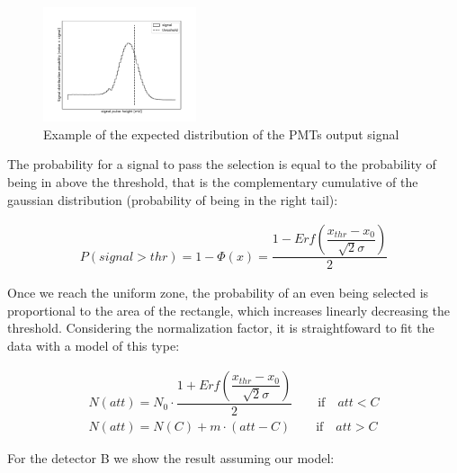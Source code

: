 {\begin{figure}[hbtp]
\centering
\includegraphics[width = 0.40\textwidth]{Analysis/distribution.pdf}
\caption{Example of the expected distribution of the PMTs output signal}
\label{fig:PDF}
\end{figure}

The probability for a signal to pass the selection is equal to the probability of being in above the threshold, that is the complementary cumulative of the gaussian distribution (probability of being in the right tail):

\begin{align*}
P(signal > thr) = 1 - \Phi(x) = \dfrac{1 - Erf(\dfrac{x_{thr} - x_{0}}{\sqrt{2} \sigma })}{2}
\end{align*}

Once we reach the uniform zone, the probability of an even being selected is proportional to the area of the rectangle, which increases linearly decreasing the threshold. Considering the normalization factor, it is straightfoward to fit the data with a model of this type:

\begin{equation}
\begin{split}
N(att) = N_{0} \cdot \dfrac{1 + Erf(\dfrac{x_{thr} - x_{0}}{\sqrt{2} \sigma })}{2} \qquad \text{if} \quad att < C  \\
N(att) = N(C) + m \cdot (att - C) \qquad \text{if} \quad att > C
\end{split}
\end{equation}

For the detector B we show the result assuming our model: 

}

